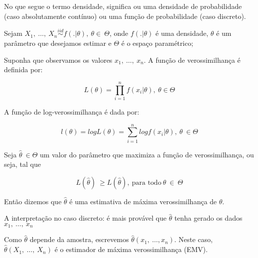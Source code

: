 \documentclass[
  letterpaper,
  DIV=11,
  numbers=noendperiod]{scrreprt}
\begin{document}

No que segue o termo densidade, significa ou uma densidade de
probabilidade (caso absolutamente contínuo) ou uma função de
probabilidade (caso discreto).

Sejam
\(X_1, \  \dots, \ X_n \overset{iid}{\sim} f(.|\theta), \ \theta \in \ \Theta\),
onde \(f(.|\theta)\) é uma densidade, \(\theta\) é um parâmetro que
desejamos estimar e \(\Theta\) é o espaço paramétrico;

Suponha que observamos os valores \(x_1, \ \dots, \ x_n\). A função de
verossimilhança é definida por:

\[ L(\theta) = \prod_{i=1}^{n} f(x_i|\theta), \ \theta \in \Theta \]

A função de log-verossimilhança é dada por:

\[ l(\theta) = logL(\theta) = \sum_{i=1}^{n} log f(x_i|\theta), \ \theta \ \in \Theta\]

Seja \(\hat{\theta} \ \in \Theta\) um valor do parâmetro que maximiza a
função de verossimilhança, ou seja, tal que

\[L(\hat{\theta}) \ \geq L(\hat{\theta}), \ \text{para todo} \ \theta \ \in \ \Theta\]

Então dizemos que \(\hat{\theta}\) é uma estimativa de máxima
verossimilhança de \(\theta\).

A interpretação no caso discreto: é mais provável que \(\hat{\theta}\)
tenha gerado os dados \(x_1, \  \dots, \ x_n\)

Como \(\hat{\theta}\) depende da amostra, escrevemos
\(\hat{\theta}(x_1, \ \dots, x_n)\). Neste caso,
\(\hat{\theta}(X_1, \ \dots, \ X_n)\) é o estimador de máxima
verossimilhança (EMV).
\end{document}
